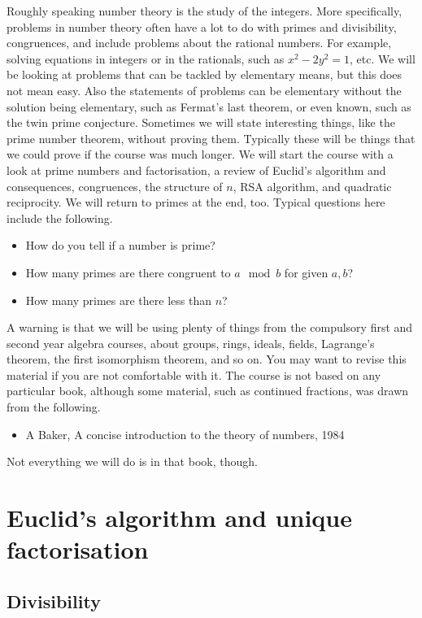 Roughly speaking number theory is the study of the integers. More specifically, problems in number theory often have a lot to do with primes and divisibility, congruences, and include problems about the rational numbers. For example, solving equations in integers or in the rationals, such as $ x^2 - 2y^2 = 1 $, etc. We will be looking at problems that can be tackled by elementary means, but this does not mean easy. Also the statements of problems can be elementary without the solution being elementary, such as Fermat's last theorem, or even known, such as the twin prime conjecture. Sometimes we will state interesting things, like the prime number theorem, without proving them. Typically these will be things that we could prove if the course was much longer. We will start the course with a look at prime numbers and factorisation, a review of Euclid's algorithm and consequences, congruences, the structure of $ \unit{n} $, RSA algorithm, and quadratic reciprocity. We will return to primes at the end, too. Typical questions here include the following.
\begin{itemize}
\item How do you tell if a number is prime?
\item How many primes are there congruent to $ a \mod b $ for given $ a, b $?
\item How many primes are there less than $ n $?
\end{itemize}
A warning is that we will be using plenty of things from the compulsory first and second year algebra courses, about groups, rings, ideals, fields, Lagrange's theorem, the first isomorphism theorem, and so on. You may want to revise this material if you are not comfortable with it. The course is not based on any particular book, although some material, such as continued fractions, was drawn from the following.
\begin{itemize}
\item A Baker, A concise introduction to the theory of numbers, 1984
\end{itemize}
Not everything we will do is in that book, though.

\pagebreak

\section{Euclid's algorithm and unique factorisation}

\subsection{Divisibility}

